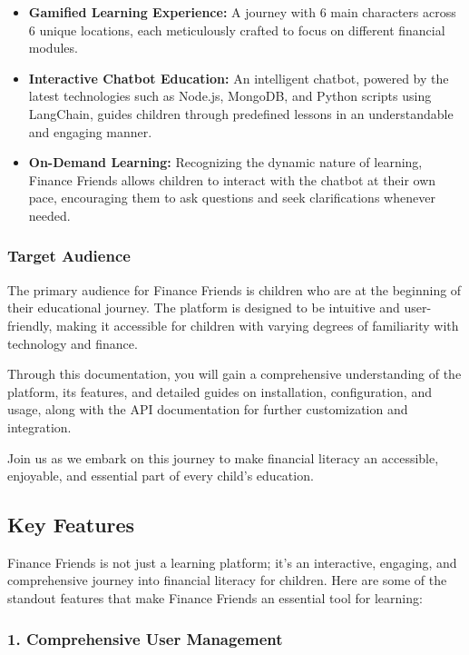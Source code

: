 \begin{itemize}
\tightlist
\item
  \textbf{Gamified Learning Experience:} A journey with 6 main
  characters across 6 unique locations, each meticulously crafted to
  focus on different financial modules.
\item
  \textbf{Interactive Chatbot Education:} An intelligent chatbot,
  powered by the latest technologies such as Node.js, MongoDB, and
  Python scripts using LangChain, guides children through predefined
  lessons in an understandable and engaging manner.
\item
  \textbf{On-Demand Learning:} Recognizing the dynamic nature of
  learning, Finance Friends allows children to interact with the chatbot
  at their own pace, encouraging them to ask questions and seek
  clarifications whenever needed.
\end{itemize}

\hypertarget{target-audience}{%
\subsubsection{Target Audience}\label{target-audience}}

The primary audience for Finance Friends is children who are at the
beginning of their educational journey. The platform is designed to be
intuitive and user-friendly, making it accessible for children with
varying degrees of familiarity with technology and finance.

Through this documentation, you will gain a comprehensive understanding
of the platform, its features, and detailed guides on installation,
configuration, and usage, along with the API documentation for further
customization and integration.

Join us as we embark on this journey to make financial literacy an
accessible, enjoyable, and essential part of every child's education.

\hypertarget{key-features-1}{%
\subsection{Key Features}\label{key-features-1}}

Finance Friends is not just a learning platform; it's an interactive,
engaging, and comprehensive journey into financial literacy for
children. Here are some of the standout features that make Finance
Friends an essential tool for learning:

\hypertarget{comprehensive-user-management}{%
\subsubsection{1. Comprehensive User
Management}\label{comprehensive-user-management}}


